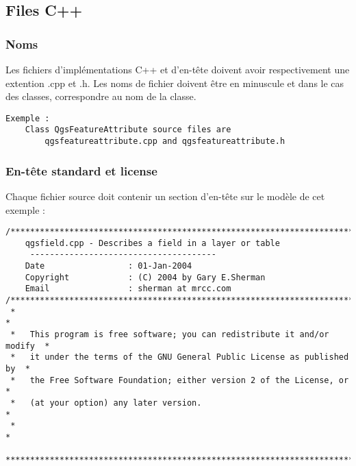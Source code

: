\subsection{Files C++}
\subsubsection{Noms}
Les fichiers d'impl\'ementations C++ et d'en-t\^ete doivent avoir respectivement une extention .cpp et .h. Les noms de fichier doivent \^etre en minuscule et dans le cas des classes, correspondre au nom de la classe.

\begin{verbatim}
Exemple :
	Class QgsFeatureAttribute source files are 
		qgsfeatureattribute.cpp and qgsfeatureattribute.h
\end{verbatim}

\subsubsection{En-t\^ete standard et license}
Chaque fichier source doit contenir un section d'en-t\^ete sur le mod\`ele de cet exemple :

\begin{verbatim}
/***************************************************************************
    qgsfield.cpp - Describes a field in a layer or table
     --------------------------------------
    Date                 : 01-Jan-2004
    Copyright            : (C) 2004 by Gary E.Sherman
    Email                : sherman at mrcc.com
/***************************************************************************
 *                                                                         *
 *   This program is free software; you can redistribute it and/or modify  *
 *   it under the terms of the GNU General Public License as published by  *
 *   the Free Software Foundation; either version 2 of the License, or     *
 *   (at your option) any later version.                                   *
 *                                                                         *
 ***************************************************************************/
\end{verbatim}

